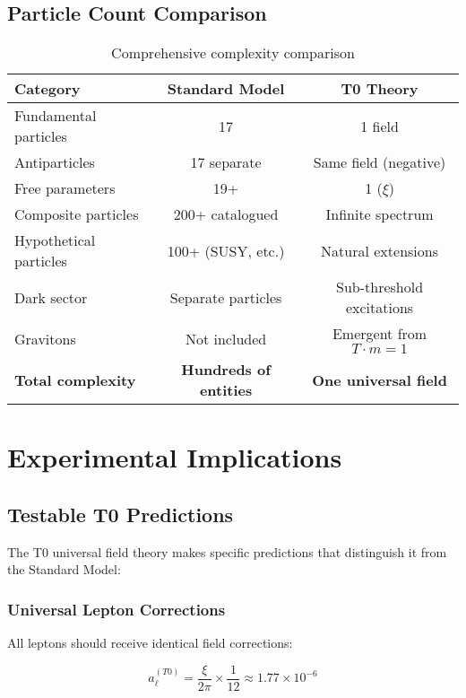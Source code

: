 \documentclass[12pt,a4paper]{article}
\newcommand{\xipar}{\xi}
\begin{document}
	\subsection{Particle Count Comparison}
	
	\begin{table}[htbp]
		\centering
		\begin{tabular}{|l|c|c|}
			\hline
			\textbf{Category} & \textbf{Standard Model} & \textbf{T0 Theory} \\
			\hline
			\hline
			Fundamental particles & 17 & 1 field \\
			Antiparticles & 17 separate & Same field (negative) \\
			Free parameters & 19+ & 1 ($\xipar$) \\
			Composite particles & 200+ catalogued & Infinite spectrum \\
			Hypothetical particles & 100+ (SUSY, etc.) & Natural extensions \\
			Dark sector & Separate particles & Sub-threshold excitations \\
			Gravitons & Not included & Emergent from $T \cdot m = 1$ \\
			\hline
			\textbf{Total complexity} & \textbf{Hundreds of entities} & \textbf{One universal field} \\
			\hline
		\end{tabular}
		\caption{Comprehensive complexity comparison}
		\label{tab:complexity_comparison}
	\end{table}
	
	\section{Experimental Implications}
	
	\subsection{Testable T0 Predictions}
	
	The T0 universal field theory makes specific predictions that distinguish it from the Standard Model:
	
	\subsubsection{Universal Lepton Corrections}
	
	All leptons should receive identical field corrections:
	
	\begin{equation}
		a_\ell^{(T0)} = \frac{\xipar}{2\pi} \times \frac{1}{12} \approx 1.77 \times 10^{-6}
		\label{eq:universal_lepton_correction}
	\end{equation}
	
\end{document}
